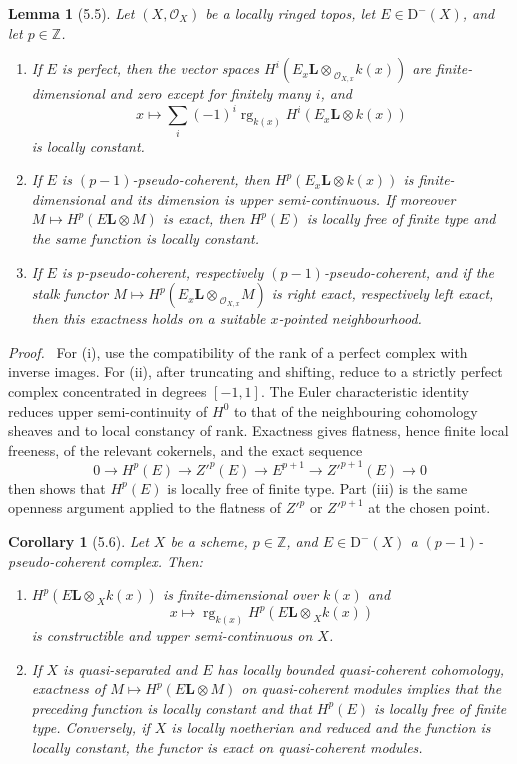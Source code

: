 \documentclass[13pt]{extarticle}
\newcommand{\ZZ}{\mathbb Z}
\newcommand{\cO}{\mathcal O}
\newcommand{\D}{\mathrm D}
\newcommand{\rg}{\operatorname{rg}}
\newcommand{\Ltens}{\mathbin{\mathbf L\!\otimes}}
\newenvironment{prooftext}[1][Proof]{\par\noindent\emph{#1.}\ }{\par\medskip}
\newtheorem*{lemma*}{Lemma}
\newtheorem*{corollary*}{Corollary}
\begin{document}
\begin{lemma*}[5.5]
Let $(X,\cO_X)$ be a locally ringed topos, let $E\in\D^-(X)$, and let $p\in\ZZ$.
\begin{enumerate}[label=(\roman*)]
\item If $E$ is perfect, then the vector spaces $H^i(E_x\Ltens_{\cO_{X,x}}k(x))$ are finite-dimensional and zero except for finitely many $i$, and
\[
x\mapsto\sum_i(-1)^i\rg_{k(x)}H^i(E_x\Ltens k(x))
\]
is locally constant.
\item If $E$ is $(p-1)$-pseudo-coherent, then $H^p(E_x\Ltens k(x))$ is finite-dimensional and its dimension is upper semi-continuous. If moreover $M\mapsto H^p(E\Ltens M)$ is exact, then $H^p(E)$ is locally free of finite type and the same function is locally constant.
\item If $E$ is $p$-pseudo-coherent, respectively $(p-1)$-pseudo-coherent, and if the stalk functor $M\mapsto H^p(E_x\Ltens_{\cO_{X,x}}M)$ is right exact, respectively left exact, then this exactness holds on a suitable $x$-pointed neighbourhood.
\end{enumerate}
\end{lemma*}

\begin{prooftext}
For (i), use the compatibility of the rank of a perfect complex with inverse images. For (ii), after truncating and shifting, reduce to a strictly perfect complex concentrated in degrees $[-1,1]$. The Euler characteristic identity reduces upper semi-continuity of $H^0$ to that of the neighbouring cohomology sheaves and to local constancy of rank. Exactness gives flatness, hence finite local freeness, of the relevant cokernels, and the exact sequence
\[
0\to H^p(E)\to Z'^p(E)\to E^{p+1}\to Z'^{p+1}(E)\to0
\]
then shows that $H^p(E)$ is locally free of finite type. Part (iii) is the same openness argument applied to the flatness of $Z'^p$ or $Z'^{p+1}$ at the chosen point.
\end{prooftext}

\begin{corollary*}[5.6]
Let $X$ be a scheme, $p\in\ZZ$, and $E\in\D^-(X)$ a $(p-1)$-pseudo-coherent complex. Then:
\begin{enumerate}[label=(\roman*)]
\item $H^p(E\Ltens_X k(x))$ is finite-dimensional over $k(x)$ and
\[
x\mapsto\rg_{k(x)}H^p(E\Ltens_X k(x))
\]
is constructible and upper semi-continuous on $X$.
\item If $X$ is quasi-separated and $E$ has locally bounded quasi-coherent cohomology, exactness of $M\mapsto H^p(E\Ltens M)$ on quasi-coherent modules implies that the preceding function is locally constant and that $H^p(E)$ is locally free of finite type. Conversely, if $X$ is locally noetherian and reduced and the function is locally constant, the functor is exact on quasi-coherent modules.
\end{enumerate}
\end{corollary*}
\end{document}
